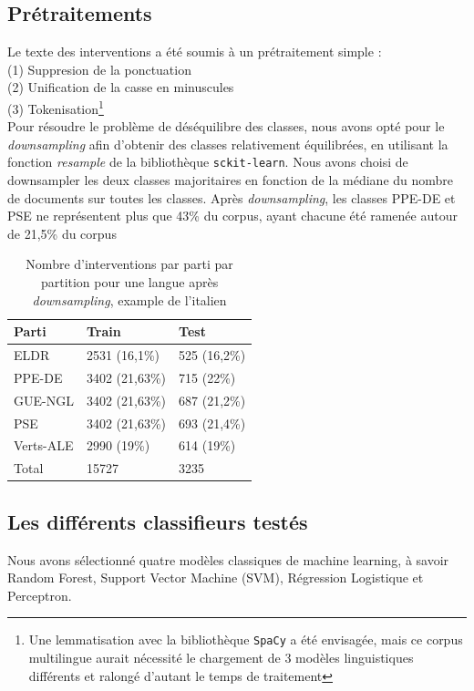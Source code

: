 \subsection{Prétraitements}
Le texte des interventions a été soumis à un prétraitement simple :\\
\indent(1) Suppresion de la ponctuation\\
\indent(2) Unification de la casse en minuscules\\
\indent(3) Tokenisation\footnote {Une lemmatisation avec la bibliothèque \texttt{SpaCy} a été envisagée,
mais ce corpus multilingue aurait nécessité le chargement de 3 modèles linguistiques
différents et ralongé d'autant le temps de traitement}
\\
Pour résoudre le problème de déséquilibre des classes, nous avons opté pour le 
\textit{downsampling} afin d'obtenir des classes relativement équilibrées,
en utilisant la fonction \textit{resample} de la bibliothèque \texttt{sckit-learn}. Nous avons choisi de downsampler les deux classes majoritaires en fonction de la médiane du nombre de documents sur toutes les classes. Après \textit{downsampling},
les classes PPE-DE et PSE ne représentent plus que 43\% du corpus, ayant chacune été ramenée autour de 21,5\% du corpus

\begin{table}[ht]
    \centering
\begin{tabular}{|l|l|l|}
\hline
Parti & Train & Test\\ \hline
ELDR & 2531 (16,1\%) & 525 (16,2\%) \\ \hline
PPE-DE & 3402 (21,63\%) & 715 (22\%) \\ \hline
GUE-NGL & 3402 (21,63\%) & 687 (21,2\%) \\ \hline
PSE & 3402 (21,63\%) & 693 (21,4\%) \\ \hline
Verts-ALE & 2990 (19\%) & 614 (19\%)\\ \hline
Total & 15727 & 3235\\ \hline
\end{tabular}
\caption{Nombre d'interventions par parti par partition pour une langue après \textit{downsampling}, example de l'italien}
\label{tab:stats_downsampled}
\end{table}

\subsection{Les différents classifieurs testés}

Nous avons sélectionné quatre modèles classiques de machine learning, à savoir Random Forest, Support Vector Machine (SVM),  Régression Logistique et Perceptron.

